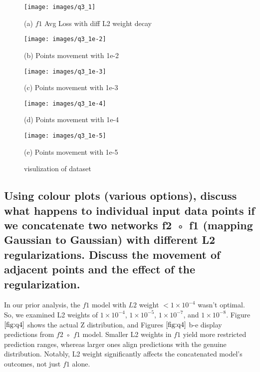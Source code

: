 \documentclass{article}
\begin{document}
\begin{figure}[htb]

  \begin{minipage}[b]{1.0\linewidth}
    \centering
    \centerline{\texttt{[image: images/q3\_1]}}
   \centerline{(a) $f1$ Avg Loss with diff L2 weight decay }\medskip
  \end{minipage}
  \begin{minipage}[b]{.48\linewidth}
    \centering
    \centerline{\texttt{[image: images/q3\_1e-2]}}
    \centerline{(b) Points movement with 1e-2}\medskip
  \end{minipage}
  \hfill
  \begin{minipage}[b]{0.48\linewidth}
    \centering
    \centerline{\texttt{[image: images/q3\_1e-3]}}
    \centerline{(c) Points movement with 1e-3}\medskip
  \end{minipage}
  \begin{minipage}[b]{.48\linewidth}
    \centering
    \centerline{\texttt{[image: images/q3\_1e-4]}}
    \centerline{(d) Points movement with 1e-4}\medskip
  \end{minipage}
  \hfill
  \begin{minipage}[b]{0.48\linewidth}
    \centering
    \centerline{\texttt{[image: images/q3\_1e-5]}}
    \centerline{(e) Points movement with 1e-5}\medskip
  \end{minipage}
  \caption{visulization of dataset}
  \label{fig:q3}
  \end{figure}

\subsection{Using colour plots (various options), discuss what happens to individual
input data points if we concatenate two networks f2 ◦ f1 (mapping
Gaussian to Gaussian) with different L2 regularizations. Discuss the
movement of adjacent points and the effect of the regularization.}
\label{ssec:q4}

In our prior analysis, 
the $f1$ model with $L2$ weight $ < 1\times10^{-4}$ wasn't optimal. 
So, we examined L2 weights of $1\times10^{-4}$, $1\times10^{-5}$, 
$1\times10^{-7}$, and $1\times10^{-8}$. 
Figure $\ref{fig:q4}$ shows the actual Z distribution, 
and Figures $\ref{fig:q4}$ b-e display predictions from $f2$ ◦ $f1$ model. 
Smaller L2 weights in $f1$ yield more restricted prediction ranges, 
whereas larger ones align predictions with the genuine distribution. 
Notably, L2 weight significantly affects the concatenated model's outcomes, 
not just $f1$ alone.
\end{document}
